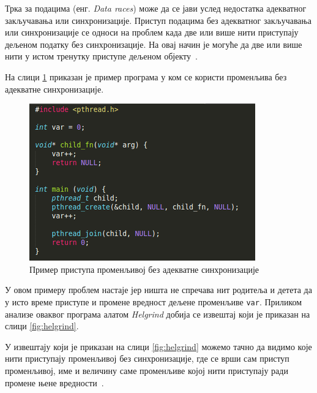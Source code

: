 \documentclass[12pt,oneside]{memoir}
\begin{document}
\indent Трка за подацима (енг. \textit{Data races}) може да се јави услед недостатка адекватног закључавања или синхронизације. Приступ подацима без адекватног закључавања или синхронизације се односи на проблем када две или више нити приступају дељеном податку без синхронизације. На овај начин је могуће да две или више нити у истом тренутку приступе дељеном објекту~\cite{helgrindRef}.

\indent На слици \ref{fig:main4} приказан је пример програма у ком се користи променљива без адекватне синхронизације.

\begin{figure}[h!]
\begin{center}
\includegraphics[scale=0.75]{slika14.png}
\end{center}
\caption{Пример приступа променљивој без адекватне синхронизације}
\label{fig:main4}
\end{figure}


\indent У овом примеру проблем настаје јер ништа не спречава нит родитеља и детета да у исто време приступе и промене вредност дељене променљиве \texttt{var}. Приликом анализе оваквог програма алатом \textit{Helgrind} добија се извештај који је приказан на слици \ref{fig:helgrind}.

\indent У извештају који је приказан на слици \ref{fig:helgrind} можемо тачно да видимо које нити приступају променљивој без синхронизације, где се врши сам приступ променљивој, име и величину саме променљиве којој нити приступају ради промене њене вредности~\cite{helgrindRef}.
\end{document}
